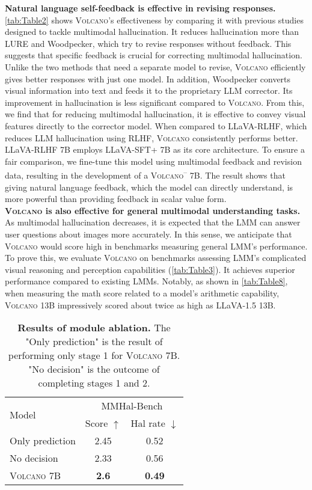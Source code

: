 \documentclass[11pt]{article}
\newcommand{\Ours}{\textsc{Volcano}}
\begin{document}
\textbf{Natural language self-feedback is effective in revising responses.} \autoref{tab:Table2} shows {\Ours}'s effectiveness by comparing it with previous studies designed to tackle multimodal hallucination. It reduces hallucination more than LURE and Woodpecker, which try to revise responses without feedback. This suggests that specific feedback is crucial for correcting multimodal hallucination. Unlike the two methods that need a separate model to revise, {\Ours} efficiently gives better responses with just one model. In addition, Woodpecker converts visual information into text and feeds it to the proprietary LLM corrector. Its improvement in hallucination is less significant compared to {\Ours}. From this, we find that for reducing multimodal hallucination, it is effective to convey visual features directly to the corrector model. When compared to LLaVA-RLHF, which reduces LLM hallucination using RLHF, {\Ours} consistently performs better. LLaVA-RLHF 7B employs LLaVA-SFT+ 7B as its core architecture. To ensure a fair comparison, we fine-tune this model using multimodal feedback and revision data, resulting in the development of a {\Ours}\textsuperscript{--} 7B. The result shows that giving natural language feedback, which the model can directly understand, is more powerful than providing feedback in scalar value form. \\
\textbf{{\Ours} is also effective for general multimodal understanding tasks.} As multimodal hallucination decreases, it is expected that the LMM can answer user questions about images more accurately. In this sense, we anticipate that {\Ours} would score high in benchmarks measuring general LMM's performance. To prove this, we evaluate {\Ours} on benchmarks assessing LMM's complicated visual reasoning and perception capabilities (\autoref{tab:Table3}). It achieves superior performance compared to existing LMMs. Notably, as shown in \autoref{tab:Table8}, when measuring the math score related to a model's arithmetic capability, {\Ours} 13B impressively scored about twice as high as LLaVA-1.5 13B.
\begin{table}[h]
\centering
\small
\begin{tabular}{lcc}
\toprule
\multirow{2}{*}{Model} & \multicolumn{2}{c}{MMHal-Bench} \\
& Score $\uparrow$ & Hal rate $\downarrow$  \\
\midrule
Only prediction  & 2.45 & 0.52  \\
No decision & 2.33	& 0.56  \\
{\Ours} 7B & \textbf{2.6} & \textbf{0.49} \\
\bottomrule
\end{tabular}
\caption{\textbf{Results of module ablation.}   The "Only prediction" is the result of performing only stage 1 for {\Ours} 7B. "No decision" is the outcome of completing stages 1 and 2.}
\label{tab:Table4}
\end{table}
\end{document}
